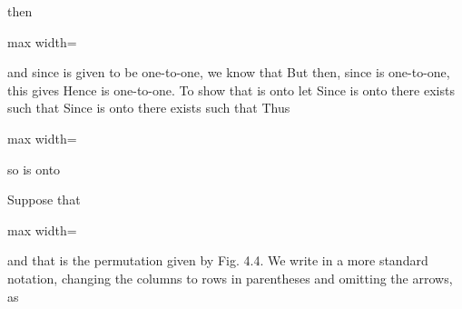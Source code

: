 \documentclass[11pt,oneside]{article}
\begin{document}
\BookNarrativetrue

\begin{BookBody}

\noindent then

\begin{center}\begin{adjustbox}{max width=\linewidth}\end{adjustbox}\end{center}

\noindent and since \BookInline{\sigma } is given to be one-to-one, we know that  But then, since \BookInline{\tau } is one-to-one, this gives  Hence \BookInline{\sigma \tau } is one-to-one. To show that \BookInline{\sigma \tau } is onto  let  Since \BookInline{\sigma } is onto  there exists  such that  Since \BookInline{\tau } is onto  there exists  such that  Thus

\begin{center}\begin{adjustbox}{max width=\linewidth}\end{adjustbox}\end{center}

\noindent so \BookInline{\sigma \tau } is onto 

 Suppose that

\begin{center}\begin{adjustbox}{max width=\linewidth}\end{adjustbox}\end{center}

\noindent and that \BookInline{\sigma } is the permutation given by Fig. 4.4. We write \BookInline{\sigma } in a more standard notation, changing the columns to rows in parentheses and omitting the arrows, as


\end{BookBody}
\end{document}
